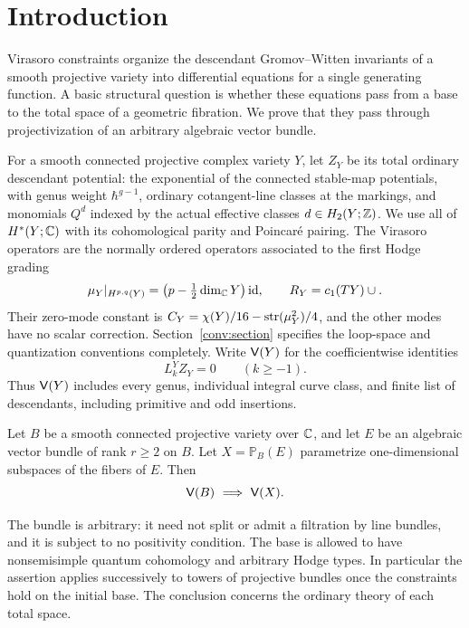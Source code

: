 \section{Introduction}
\label{intro:section}

Virasoro constraints organize the descendant Gromov--Witten
invariants of a smooth projective variety into differential equations
for a single generating function. A basic structural question is
whether these equations pass from a base to the total space of a
geometric fibration. We prove that they pass through
projectivization of an arbitrary algebraic vector bundle.

For a smooth connected projective complex variety $Y$, let $Z_Y$
be its total ordinary descendant potential: the exponential of the
connected stable-map potentials, with genus weight $\hbar^{g-1}$,
ordinary cotangent-line classes at the markings, and monomials
$Q^d$ indexed by the actual effective classes
$d\in H_2(Y;\mathbb Z)$. We use all of $H^*(Y;\mathbb C)$ with its cohomological
parity and Poincar\'e pairing. The Virasoro operators are the
normally ordered operators associated to the first Hodge grading
\[
 \mu_Y|_{H^{p,q}(Y)}
       =\bigl(p-\tfrac12\dim_\mathbb C Y\bigr)\operatorname{id},
 \qquad R_Y=c_1(TY)\cup.
\]
Their zero-mode constant is
$C_Y=\chi(Y)/16-\operatorname{str}(\mu_Y^2)/4$, and the other modes have no
scalar correction. Section~\ref{conv:section} specifies the
loop-space and quantization conventions completely. Write
$\mathsf V(Y)$ for the coefficientwise identities
\[
                      L_k^Y Z_Y=0\qquad(k\geq-1).
\]
Thus $\mathsf V(Y)$ includes every genus, individual integral curve
class, and finite list of descendants, including primitive and odd
insertions.

\begin{theorem}
\label{thm:main}
Let $B$ be a smooth connected projective variety over $\mathbb C$, and
let $E$ be an algebraic vector bundle of rank $r\geq2$ on $B$.
Let $X=\mathbb P_B(E)$ parametrize one-dimensional subspaces of
the fibers of $E$. Then
\[
                           \V(B)\ \Longrightarrow\ \V(X).
\]
\end{theorem}

The bundle is arbitrary: it need not split or admit a filtration
by line bundles, and it is subject to no positivity condition.
The base is allowed to have nonsemisimple quantum cohomology
and arbitrary Hodge types. In particular the assertion applies
successively to towers of projective bundles once the constraints
hold on the initial base. The conclusion concerns the ordinary
theory of each total space.

